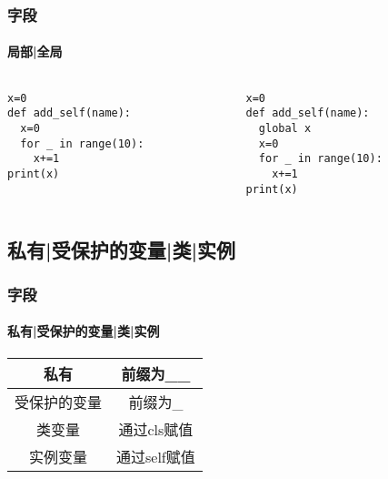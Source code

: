 \documentclass{beamer}
\begin{document}
\begin{frame}[fragile]
\frametitle{字段}
\framesubtitle{局部|全局}
\begin{columns}
\begin{column}{0.5\textwidth}
  \begin{verbatim}
x=0
def add_self(name):
  x=0
  for _ in range(10):
    x+=1
print(x)
  \end{verbatim}
\end{column}
\begin{column}{0.5\textwidth}
  \begin{verbatim}
x=0
def add_self(name):
  global x
  x=0
  for _ in range(10):
    x+=1
print(x)
  \end{verbatim}
\end{column}
\end{columns}
\end{frame}

\subsection{私有|受保护的变量|类|实例}%

\begin{frame}[t]
	\frametitle{字段}
	\framesubtitle{私有|受保护的变量|类|实例}
	\begin{center}
		\begin{tabular}{|c|c|}
			\hline
			私有 & 前缀为\_\_ \\
			\hline
			受保护的变量 & 前缀为\_ \\
			\hline
			类变量 & 通过cls赋值 \\
			\hline
			实例变量 & 通过self赋值 \\
			\hline
		\end{tabular}
	\end{center}
\end{frame}
\end{document}
